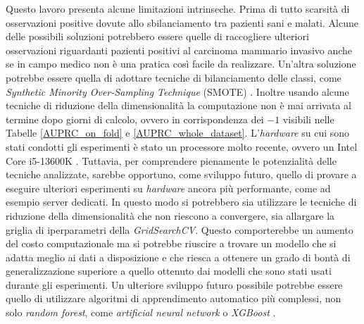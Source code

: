 \documentclass[12pt,italian]{report}
\begin{document}
	Questo lavoro presenta alcune limitazioni intrinseche. Prima di tutto scarsità di osservazioni positive dovute allo sbilanciamento tra pazienti sani e malati. Alcune delle possibili soluzioni potrebbero essere quelle di raccogliere ulteriori osservazioni riguardanti pazienti positivi al carcinoma mammario invasivo  anche se in campo medico non è una pratica così facile da realizzare. Un'altra soluzione potrebbe essere quella di adottare tecniche di bilanciamento delle classi, come \textit{Synthetic Minority Over-Sampling Technique} (SMOTE) \cite{chawla2002smote}.
	Inoltre usando alcune tecniche di riduzione della dimensionalità la computazione non è mai arrivata al termine dopo giorni di calcolo, ovvero in corrispondenza dei $-1$ visibili nelle Tabelle \ref{AUPRC_on_fold} e \ref{AUPRC_whole_dataset}.
	L'\textit{hardware} su cui sono stati condotti gli esperimenti è stato un processore molto recente, ovvero un Intel Core i5-13600K \cite{i5-13600k}. Tuttavia, per comprendere pienamente le potenzialità delle tecniche analizzate, sarebbe opportuno, come sviluppo futuro, quello di provare a eseguire ulteriori esperimenti su \textit{hardware} ancora più performante, come ad esempio server dedicati. In questo modo si potrebbero sia utilizzare le tecniche di riduzione della dimensionalità che non riescono a convergere, sia allargare la griglia di iperparametri della \textit{GridSearchCV}. Questo comporterebbe un aumento del costo computazionale ma si potrebbe riuscire a trovare un modello che si adatta meglio ai dati a disposizione e che riesca a ottenere un grado di bontà di generalizzazione superiore a quello ottenuto dai modelli che sono stati usati durante gli esperimenti. 
	Un ulteriore sviluppo futuro possibile potrebbe essere quello di utilizzare algoritmi di apprendimento automatico più complessi, non solo \textit{random forest}, come \textit{artificial neural network} \cite{lisboa2006use} o \textit{XGBoost} \cite{liew2021investigation, kabiraj2020breast, zhang2020novel}.
	
	\clearpage
	
	\nocite{smlbook}
	\nocite{Kingsford2008}
	
	
	
\end{document}
